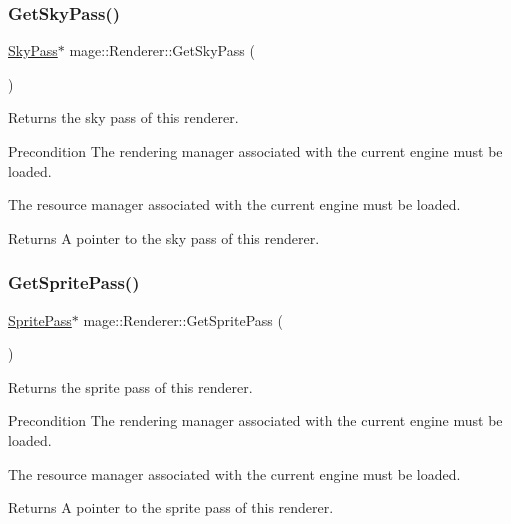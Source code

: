 \subsubsection{\texorpdfstring{Get\+Sky\+Pass()}{GetSkyPass()}}
{\footnotesize\ttfamily \hyperlink{classmage_1_1_sky_pass}{Sky\+Pass}$\ast$ mage\+::\+Renderer\+::\+Get\+Sky\+Pass (\begin{DoxyParamCaption}{ }\end{DoxyParamCaption})}

Returns the sky pass of this renderer.

\begin{DoxyPrecond}{Precondition}
The rendering manager associated with the current engine must be loaded. 

The resource manager associated with the current engine must be loaded. 
\end{DoxyPrecond}
\begin{DoxyReturn}{Returns}
A pointer to the sky pass of this renderer. 
\end{DoxyReturn}
\hypertarget{classmage_1_1_renderer_ada671ebf46487d88c326657a43184117}{}\label{classmage_1_1_renderer_ada671ebf46487d88c326657a43184117} 
\subsubsection{\texorpdfstring{Get\+Sprite\+Pass()}{GetSpritePass()}}
{\footnotesize\ttfamily \hyperlink{classmage_1_1_sprite_pass}{Sprite\+Pass}$\ast$ mage\+::\+Renderer\+::\+Get\+Sprite\+Pass (\begin{DoxyParamCaption}{ }\end{DoxyParamCaption})}

Returns the sprite pass of this renderer.

\begin{DoxyPrecond}{Precondition}
The rendering manager associated with the current engine must be loaded. 

The resource manager associated with the current engine must be loaded. 
\end{DoxyPrecond}
\begin{DoxyReturn}{Returns}
A pointer to the sprite pass of this renderer. 
\end{DoxyReturn}
\hypertarget{classmage_1_1_renderer_abc9ee209c84f87d3186b4390162b9be1}{}\label{classmage_1_1_renderer_abc9ee209c84f87d3186b4390162b9be1} 
